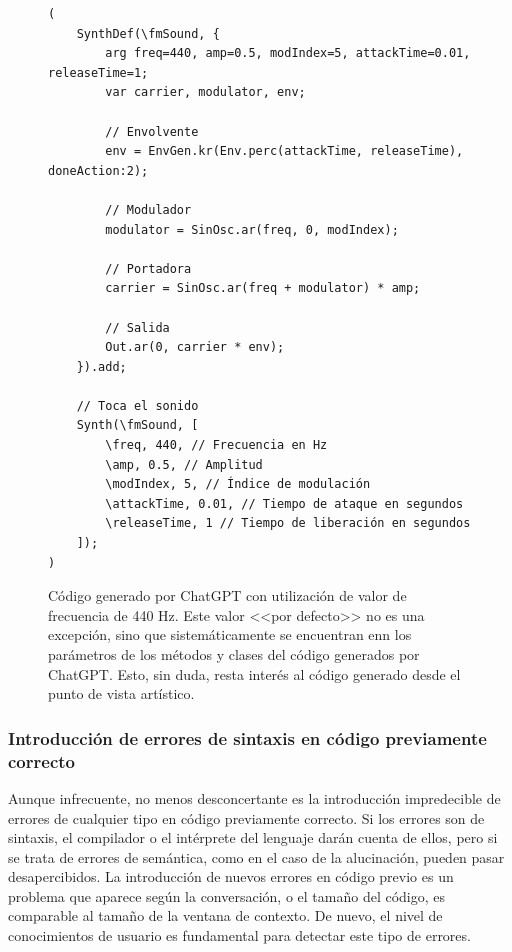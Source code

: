 \begin{figure}[H]
    \caption[]{Código generado por ChatGPT con utilización de valor de frecuencia de 440 Hz. Este valor <<por defecto>> no es una excepción, sino que sistemáticamente se encuentran enn los parámetros de los métodos y clases del código generados por ChatGPT. Esto, sin duda, resta interés al código generado desde el punto de vista artístico.}
    \centering
    \begin{lstlisting}[style=SuperCollider-IDE, basicstyle=\footnotesize\ttfamily, numbers=none]
(
    SynthDef(\fmSound, {
        arg freq=440, amp=0.5, modIndex=5, attackTime=0.01, releaseTime=1;
        var carrier, modulator, env;
    
        // Envolvente
        env = EnvGen.kr(Env.perc(attackTime, releaseTime), doneAction:2);
    
        // Modulador
        modulator = SinOsc.ar(freq, 0, modIndex);
    
        // Portadora
        carrier = SinOsc.ar(freq + modulator) * amp;
    
        // Salida
        Out.ar(0, carrier * env);
    }).add;
    
    // Toca el sonido
    Synth(\fmSound, [
        \freq, 440, // Frecuencia en Hz
        \amp, 0.5, // Amplitud
        \modIndex, 5, // Índice de modulación
        \attackTime, 0.01, // Tiempo de ataque en segundos
        \releaseTime, 1 // Tiempo de liberación en segundos
    ]);
) 
    \end{lstlisting}
    \source{\propio}
    \label{fig:ChatGPT_valores_por_defecto}
\end{figure}



\subsubsection{Introducción de errores de sintaxis en código previamente correcto}
Aunque infrecuente, no menos desconcertante es la introducción impredecible de errores de cualquier tipo en código previamente correcto. Si los errores son de sintaxis, el compilador o el intérprete del lenguaje darán cuenta de ellos, pero si se trata de errores de semántica, como en el caso de la alucinación, pueden pasar desapercibidos. La introducción de nuevos errores en código previo es un problema que aparece según la conversación, o el tamaño del código, es comparable al tamaño de la ventana de contexto. De nuevo, el nivel de conocimientos de usuario es fundamental para detectar este tipo de errores.


